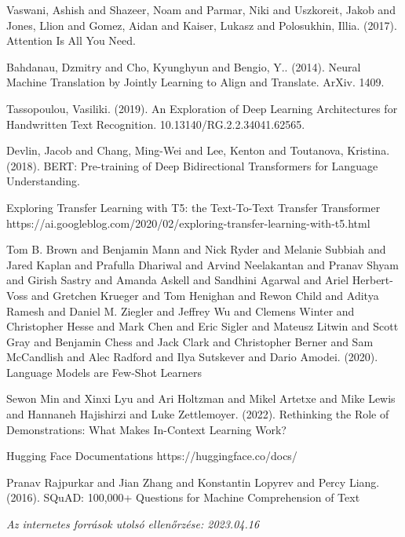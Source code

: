 \documentclass[12pt,a4paper]{report}
\begin{document}
\begin{thebibliography}{100}
 Vaswani, Ashish and Shazeer, Noam and Parmar, Niki and Uszkoreit, Jakob and Jones, Llion and Gomez, Aidan and Kaiser, Lukasz and Polosukhin, Illia. (2017). Attention Is All You Need.

 Bahdanau, Dzmitry and Cho, Kyunghyun and Bengio, Y.. (2014). Neural Machine Translation by Jointly Learning to Align and Translate. ArXiv. 1409.

 Tassopoulou, Vasiliki. (2019). An Exploration of Deep Learning Architectures for Handwritten Text Recognition. 10.13140/RG.2.2.34041.62565.

 Devlin, Jacob and Chang, Ming-Wei and Lee, Kenton and Toutanova, Kristina. (2018). BERT: Pre-training of Deep Bidirectional Transformers for Language Understanding.

 Exploring Transfer Learning with T5: the Text-To-Text Transfer Transformer https://ai.googleblog.com/2020/02/exploring-transfer-learning-with-t5.html

 Tom B. Brown and Benjamin Mann and Nick Ryder and Melanie Subbiah and Jared Kaplan and Prafulla Dhariwal and Arvind Neelakantan and Pranav Shyam and Girish Sastry and Amanda Askell and Sandhini Agarwal and Ariel Herbert-Voss and Gretchen Krueger and Tom Henighan and Rewon Child and Aditya Ramesh and Daniel M. Ziegler and Jeffrey Wu and Clemens Winter and Christopher Hesse and Mark Chen and Eric Sigler and Mateusz Litwin and Scott Gray and Benjamin Chess and Jack Clark and Christopher Berner and Sam McCandlish and Alec Radford and Ilya Sutskever and Dario Amodei. (2020). Language Models are Few-Shot Learners

 Sewon Min and Xinxi Lyu and Ari Holtzman and Mikel Artetxe and Mike Lewis and Hannaneh Hajishirzi and Luke Zettlemoyer. (2022). Rethinking the Role of Demonstrations: What Makes In-Context Learning Work?

 Hugging Face Documentations https://huggingface.co/docs/

 Pranav Rajpurkar and Jian Zhang and Konstantin Lopyrev and Percy Liang. (2016). SQuAD: 100,000+ Questions for Machine Comprehension of Text
\end{thebibliography}


\noindent \textit{Az internetes források utolsó ellenőrzése: 2023.04.16}

\pagestyle{empty}

\newpage


\end{document}
